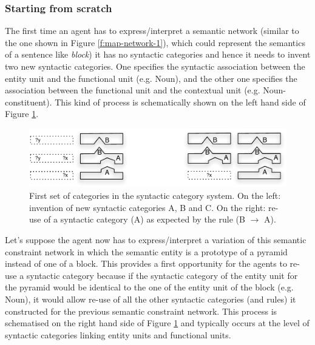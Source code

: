 \subsubsection{Starting from scratch}

The first time an agent has to express/interpret a semantic network
(similar to the one shown in Figure \ref{f:map-network-1}), which
could represent the semantics of a sentence like \textit{block}) it has no
syntactic categories and hence it needs to invent two new syntactic
categories. One specifies the syntactic association between the entity
unit and the functional unit (e.g. Noun), and the other one specifies
the association between the functional unit and the contextual unit
(e.g. Noun-constituent). This kind of process is schematically shown
on the left hand side of Figure \ref{f:map-syntactic-categories-1}.

\begin{figure}[htbp]
  \begin{center}
    \includegraphics[width=\textwidth]{./composition/figures/mapping-1.pdf}
    \caption[First set of categories in the syntactic category
    system]{First set of categories in the syntactic category system. On
      the left: invention of new syntactic categories A, B and C. On
      the right: re-use of a syntactic category (A) as expected by the
      rule (B $\rightarrow$ A).}
    \label{f:map-syntactic-categories-1}
  \end{center}
\end{figure}

Let's suppose the agent now has to express/interpret a variation of
this semantic constraint network in which the semantic entity is a
prototype of a pyramid instead of one of a block. This provides a
first opportunity for the agents to re-use a syntactic category because
if the syntactic category of the entity unit for the pyramid would be
identical to the one of the entity unit of the block (e.g. Noun), it
would allow re-use of all the other syntactic categories (and rules) it
constructed for the previous semantic constraint network. This process
is schematised on the right hand side of Figure
\ref{f:map-syntactic-categories-1} and typically occurs at the level
of syntactic categories linking entity units and functional units.


